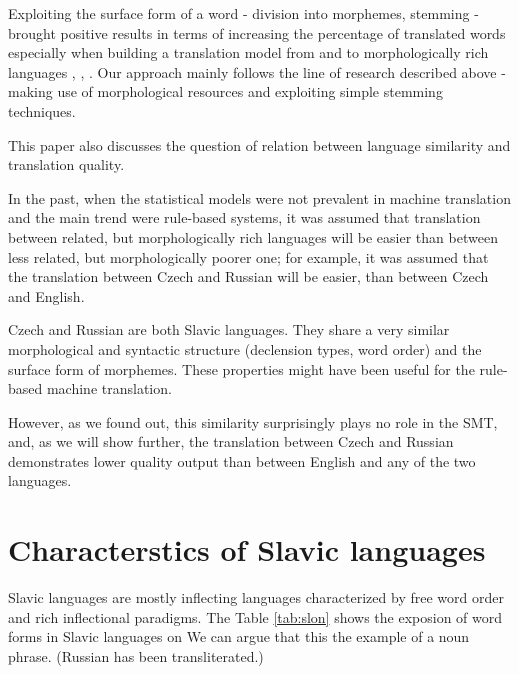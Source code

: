 \documentclass[11pt,letterpaper]{article}
\begin{document}
Exploiting the surface form of a word - division into morphemes, stemming - brought
positive results in terms of increasing the percentage of translated words 
especially when building a translation  model from and to morphologically rich languages \cite{popovic},
\cite{oflazer}, \cite{gispert}.  
Our approach mainly follows the line of research described above - making use of 
morphological resources and exploiting simple stemming techniques.

This paper also discusses the question of relation between language similarity and translation quality.

In the past, when the statistical models were not prevalent in machine translation and the main trend were rule-based systems, it was assumed that translation between related, but morphologically rich languages will be easier than between less related, but morphologically poorer one; for example, it was assumed that the translation between Czech and Russian will be easier, than between Czech and English.

Czech and Russian are both Slavic languages. They share a very similar morphological and syntactic
structure (declension types, word order) and the surface form of morphemes. These properties 
might have been useful for the rule-based machine translation. 

However, as we found out, this similarity surprisingly
 plays no role in the SMT, and, as we will show further,
the translation between Czech and Russian demonstrates lower quality output than 
between English and any of the two languages.

\section{Characterstics of Slavic languages}
Slavic languages are mostly inflecting languages characterized by free word order and rich
inflectional paradigms. %
The Table \ref{tab:slon} shows the exposion of word forms in Slavic languages on
We can argue that this 
the example of a noun phrase. (Russian has been transliterated.)
\end{document}
